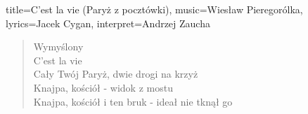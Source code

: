 \begin{song}{title={C'est la vie (Paryż z pocztówki)}, music={Wiesław Pieregorólka}, lyrics={Jacek Cygan}, interpret={Andrzej Zaucha}}
\begin{multicols}{2}
\begin{verse}
        Wymyślony  \\
        C'est la vie \\ 
        Cały Twój Paryż, dwie drogi na krzyż \\ 
        Knajpa, kościół - widok z mostu \\
        Knajpa, kościół i ten bruk - ideał nie tknął go \\
    \end{verse}
    \end{multicols}
\end{song}

